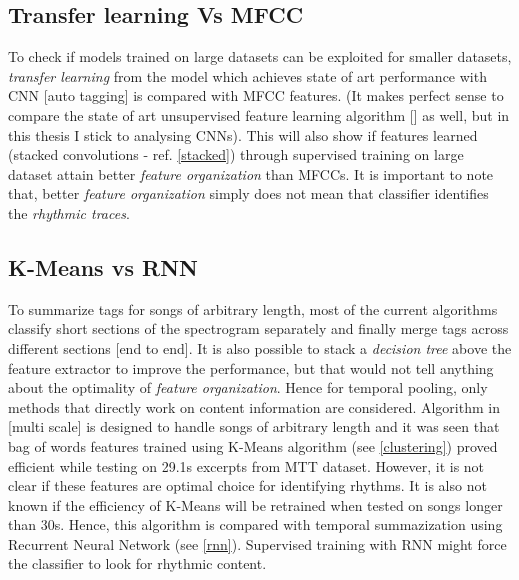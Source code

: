\subsection{Transfer learning Vs MFCC}
\label{transfer}
To check if models trained on large datasets can be exploited for smaller datasets, \textit{transfer learning} from the model which achieves state of art performance with CNN [auto tagging] is compared with MFCC features. (It makes perfect sense to compare the state of art unsupervised feature learning algorithm [] as well, but in this thesis I stick to analysing CNNs). This will also show if features learned (stacked convolutions - ref. \ref{stacked}) through supervised training on large dataset attain better \textit{feature organization} than MFCCs. It is important to note that, better \textit{feature organization} simply does not mean that classifier identifies the \textit{rhythmic traces}.

\subsection{K-Means vs RNN}
\label{kmeans}
To summarize tags for songs of arbitrary length, most of the current algorithms classify short sections of the spectrogram separately and finally merge tags across different sections [end to end]. It is also possible to stack a \textit{decision tree} above the feature extractor to improve the performance, but that would not tell anything about the optimality of \textit{feature organization}. Hence for temporal pooling, only methods that directly work on content information are considered. Algorithm in [multi scale] is designed to handle songs of arbitrary length and it was seen that bag of words features trained using K-Means algorithm (see \ref{clustering}) proved efficient while testing on 29.1s excerpts from MTT dataset. However, it is not clear if these features are optimal choice for identifying rhythms.  It is also not known if the efficiency of K-Means will be retrained when tested on songs longer than 30s. Hence, this algorithm is compared with temporal summazization using Recurrent Neural Network (see \ref{rnn}). Supervised training with RNN might force the classifier to look for rhythmic content.    
        
 
 